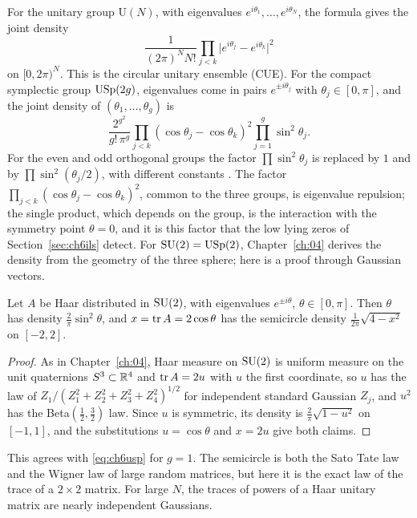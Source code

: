 For the unitary group $\mathrm{U}(N)$, with eigenvalues $e^{i\theta_1},\dots,e^{i\theta_N}$, the formula gives the joint density
\[
\frac{1}{(2\pi)^NN!}\prod_{j<k}\bigl|e^{i\theta_j}-e^{i\theta_k}\bigr|^2
\]
on $[0,2\pi)^N$. This is the circular unitary ensemble (CUE). For the compact symplectic group $\mathrm{USp}(2g)$, eigenvalues come in pairs $e^{\pm i\theta_j}$ with $\theta_j\in[0,\pi]$, and the joint density of $(\theta_1,\dots,\theta_g)$ is
\begin{equation}\label{eq:ch6usp}
\frac{2^{g^2}}{g!\,\pi^g}\prod_{j<k}(\cos\theta_j-\cos\theta_k)^2\prod_{j=1}^g\sin^2\theta_j .
\end{equation}
For the even and odd orthogonal groups the factor $\prod\sin^2\theta_j$ is replaced by $1$ and by $\prod\sin^2(\theta_j/2)$, with different constants \cite{katzsarnak1999}. The factor $\prod_{j<k}(\cos\theta_j-\cos\theta_k)^2$, common to the three groups, is eigenvalue repulsion; the single product, which depends on the group, is the interaction with the symmetry point $\theta=0$, and it is this factor that the low lying zeros of Section~\ref{sec:ch6ils} detect. For $\mathrm{SU}(2)=\mathrm{USp}(2)$, Chapter~\ref{ch:04} derives the density from the geometry of the three sphere; here is a proof through Gaussian vectors.

\begin{proposition}\label{prop:ch6su2}
Let $A$ be Haar distributed in $\mathrm{SU}(2)$, with eigenvalues $e^{\pm i\theta}$, $\theta\in[0,\pi]$. Then $\theta$ has density $\frac2\pi\sin^2\theta$, and $x=\operatorname{tr} A=2\cos\theta$ has the semicircle density $\frac{1}{2\pi}\sqrt{4-x^2}$ on $[-2,2]$.
\end{proposition}

\begin{proof}
As in Chapter~\ref{ch:04}, Haar measure on $\mathrm{SU}(2)$ is uniform measure on the unit quaternions $S^3\subset\mathbb{R}^4$ and $\operatorname{tr} A=2u$ with $u$ the first coordinate, so $u$ has the law of $Z_1/(Z_1^2+Z_2^2+Z_3^2+Z_4^2)^{1/2}$ for independent standard Gaussian $Z_j$, and $u^2$ has the Beta$(\frac12,\frac32)$ law. Since $u$ is symmetric, its density is $\frac2\pi\sqrt{1-u^2}$ on $[-1,1]$, and the substitutions $u=\cos\theta$ and $x=2u$ give both claims.
\end{proof}

This agrees with \eqref{eq:ch6usp} for $g=1$. The semicircle is both the Sato Tate law and the Wigner law of large random matrices, but here it is the exact law of the trace of a $2\times2$ matrix. For large $N$, the traces of powers of a Haar unitary matrix are nearly independent Gaussians.

